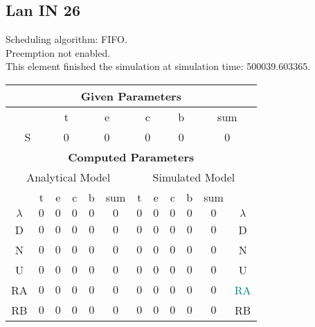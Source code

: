 \documentclass{article}
\begin{document}
\subsection{Lan IN 26}
Scheduling algorithm: FIFO.\\Preemption not enabled. \\This element finished the simulation at simulation time: 500039.603365.\\
\begin{table}[H]\centering\begin{tabular}{@{}c|cccc|c||cccc|c|c@{}}\toprule\multicolumn{12}{c}{\textbf{Given Parameters}}\\\midrule\multicolumn{2}{c|}{ } & \multicolumn{2}{c}{t} & \multicolumn{2}{c}{e} & \multicolumn{2}{c}{c} & \multicolumn{2}{c}{b} & \multicolumn{2}{|c}{sum} \\ \midrule\multicolumn{2}{c|}{S} & \multicolumn{2}{c}{0} & \multicolumn{2}{c}{0} & \multicolumn{2}{c}{0} & \multicolumn{2}{c}{0} & \multicolumn{2}{|c}{0}\\ \midrule\midrule\multicolumn{12}{c}{\textbf{Computed Parameters}}\\ \midrule\multicolumn{6}{c||}{Analytical Model} & \multicolumn{6}{c}{Simulated Model}\\ 
 \midrule & t & e & c & b & sum & t & e & c & b & sum &  \\ \midrule$\lambda$ &$0$ & $0$ & $0$ & $0$ & $0$ & $0$ & $0$ & $0$ & $0$ & $0$& $\lambda$ \\D & $0$ & $0$ & $0$ & $0$ & $0$ & $0$ & $0$ & $0$ & $0$ & $0$& D\\N & $0$ & $0$ & $0$ & $0$ & $0$ & $0$ & $0$ & $0$ & $0$ & $0$& N\\U & $0$ & $0$ & $0$ & $0$ & $0$ & $0$ & $0$ & $0$ & $0$ & $0$& U\\RA & $0$ & $0$ & $0$ & $0$ & $0$ & $0$ & $0$ & $0$ & $0$ & $0$& \textcolor{teal}{RA}\\RB & $0$ & $0$ & $0$ & $0$ & $0$ & $0$ & $0$ & $0$ & $0$ & $0$& RB\\
\bottomrule
\end{tabular}
\end{table}
\filbreak
\end{document}
